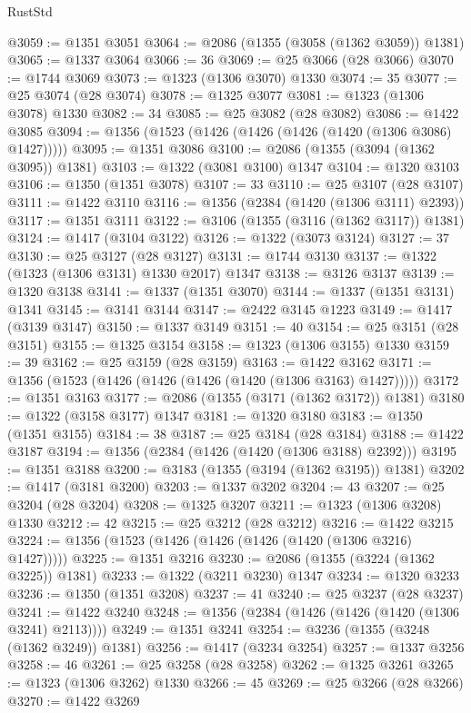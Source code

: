 \begin{lexlean}{RustStd}
\begin{coremodule}
{\begin{coremodule}
{{{{{{{{{{{{{{{{{{{{{{{{{{{{{{{{{{@3059 := @1351 @3051
@3064 := @2086 (@1355 (@3058 (@1362 @3059)) @1381)
@3065 := @1337 @3064
@3066 := 36
@3069 := @25 @3066 (@28 @3066)
@3070 := @1744 @3069
@3073 := @1323 (@1306 @3070) @1330
@3074 := 35
@3077 := @25 @3074 (@28 @3074)
@3078 := @1325 @3077
@3081 := @1323 (@1306 @3078) @1330
@3082 := 34
@3085 := @25 @3082 (@28 @3082)
@3086 := @1422 @3085
@3094 := @1356 (@1523 (@1426 (@1426 (@1426 (@1420 (@1306 @3086) @1427)))))
@3095 := @1351 @3086
@3100 := @2086 (@1355 (@3094 (@1362 @3095)) @1381)
@3103 := @1322 (@3081 @3100) @1347
@3104 := @1320 @3103
@3106 := @1350 (@1351 @3078)
@3107 := 33
@3110 := @25 @3107 (@28 @3107)
@3111 := @1422 @3110
@3116 := @1356 (@2384 (@1420 (@1306 @3111) @2393))
@3117 := @1351 @3111
@3122 := @3106 (@1355 (@3116 (@1362 @3117)) @1381)
@3124 := @1417 (@3104 @3122)
@3126 := @1322 (@3073 @3124)
@3127 := 37
@3130 := @25 @3127 (@28 @3127)
@3131 := @1744 @3130
@3137 := @1322 (@1323 (@1306 @3131) @1330 @2017) @1347
@3138 := @3126 @3137
@3139 := @1320 @3138
@3141 := @1337 (@1351 @3070)
@3144 := @1337 (@1351 @3131) @1341
@3145 := @3141 @3144
@3147 := @2422 @3145 @1223
@3149 := @1417 (@3139 @3147)
@3150 := @1337 @3149
@3151 := 40
@3154 := @25 @3151 (@28 @3151)
@3155 := @1325 @3154
@3158 := @1323 (@1306 @3155) @1330
@3159 := 39
@3162 := @25 @3159 (@28 @3159)
@3163 := @1422 @3162
@3171 := @1356 (@1523 (@1426 (@1426 (@1426 (@1420 (@1306 @3163) @1427)))))
@3172 := @1351 @3163
@3177 := @2086 (@1355 (@3171 (@1362 @3172)) @1381)
@3180 := @1322 (@3158 @3177) @1347
@3181 := @1320 @3180
@3183 := @1350 (@1351 @3155)
@3184 := 38
@3187 := @25 @3184 (@28 @3184)
@3188 := @1422 @3187
@3194 := @1356 (@2384 (@1426 (@1420 (@1306 @3188) @2392)))
@3195 := @1351 @3188
@3200 := @3183 (@1355 (@3194 (@1362 @3195)) @1381)
@3202 := @1417 (@3181 @3200)
@3203 := @1337 @3202
@3204 := 43
@3207 := @25 @3204 (@28 @3204)
@3208 := @1325 @3207
@3211 := @1323 (@1306 @3208) @1330
@3212 := 42
@3215 := @25 @3212 (@28 @3212)
@3216 := @1422 @3215
@3224 := @1356 (@1523 (@1426 (@1426 (@1426 (@1420 (@1306 @3216) @1427)))))
@3225 := @1351 @3216
@3230 := @2086 (@1355 (@3224 (@1362 @3225)) @1381)
@3233 := @1322 (@3211 @3230) @1347
@3234 := @1320 @3233
@3236 := @1350 (@1351 @3208)
@3237 := 41
@3240 := @25 @3237 (@28 @3237)
@3241 := @1422 @3240
@3248 := @1356 (@2384 (@1426 (@1426 (@1420 (@1306 @3241) @2113))))
@3249 := @1351 @3241
@3254 := @3236 (@1355 (@3248 (@1362 @3249)) @1381)
@3256 := @1417 (@3234 @3254)
@3257 := @1337 @3256
@3258 := 46
@3261 := @25 @3258 (@28 @3258)
@3262 := @1325 @3261
@3265 := @1323 (@1306 @3262) @1330
@3266 := 45
@3269 := @25 @3266 (@28 @3266)
@3270 := @1422 @3269
}}}}}}}}}}}}}}}}}}}}}}}}}}}}}}}}}}
\end{coremodule}}
\end{coremodule}
\end{lexlean}
